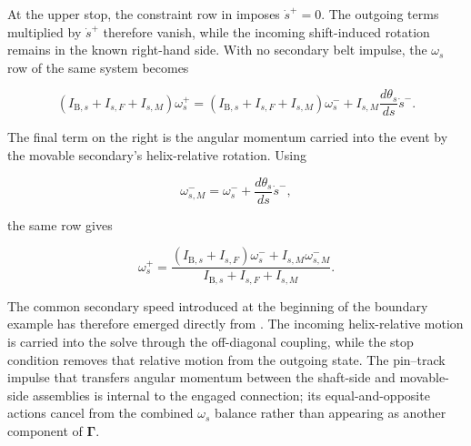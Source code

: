 \documentclass[11pt]{report}
\numberwithin{equation}{section}
\begin{document}
At the upper stop, the constraint row in
 imposes \(\dot s^+=0\).  The outgoing
terms multiplied by \(\dot s^+\) therefore vanish, while the incoming
shift-induced rotation remains in the known right-hand side.  With no
secondary belt impulse, the \(\omega_s\) row of the same system becomes

\begin{equation}
    \left(
        I_{\mathrm B,s}+I_{s,F}+I_{s,M}
    \right)\omega_s^+
    =
    \left(
        I_{\mathrm B,s}+I_{s,F}+I_{s,M}
    \right)\omega_s^-
    +
    I_{s,M}\frac{d\theta_s}{ds}\dot s^- .
    \label{eq:finite-event-upper-stop-secondary-row}
\end{equation}

The final term on the right is the angular momentum carried into the event
by the movable secondary's helix-relative rotation.  Using

\begin{equation}
    \omega_{s,M}^-
    =
    \omega_s^-
    +
    \frac{d\theta_s}{ds}\dot s^- ,
    \label{eq:finite-event-secondary-movable-incoming-speed}
\end{equation}

the same row gives

\begin{equation}
    \omega_s^+
    =
    \frac{
        (I_{\mathrm B,s}+I_{s,F})\omega_s^-
        +
        I_{s,M}\omega_{s,M}^-
    }{
        I_{\mathrm B,s}+I_{s,F}+I_{s,M}
    }.
    \label{eq:finite-event-upper-stop-common-speed}
\end{equation}

The common secondary speed introduced at the beginning of the boundary
example has therefore emerged directly from
.  The incoming helix-relative motion is
carried into the solve through the off-diagonal coupling, while the stop
condition removes that relative motion from the outgoing state.  The
pin--track impulse that transfers angular momentum between the shaft-side
and movable-side assemblies is internal to the engaged connection; its
equal-and-opposite actions cancel from the combined \(\omega_s\) balance
rather than appearing as another component of
\(\boldsymbol\Gamma\).
\end{document}
